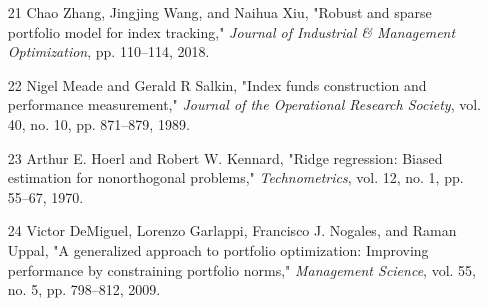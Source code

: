 \documentclass{article}
\begin{document}
\begin{itemize}
\item 
[21] Chao Zhang, Jingjing Wang, and Naihua Xiu, "Robust and sparse portfolio model for index tracking," \textit{Journal of Industrial \& Management Optimization}, pp. 110–114, 2018.

\item 
[22] Nigel Meade and Gerald R Salkin, "Index funds construction and performance measurement," \textit{Journal of the Operational Research Society}, vol. 40, no. 10, pp. 871–879, 1989.

\item 
[23] Arthur E. Hoerl and Robert W. Kennard, "Ridge regression: Biased estimation for nonorthogonal problems," \textit{Technometrics}, vol. 12, no. 1, pp. 55–67, 1970.

\item 
[24] Victor DeMiguel, Lorenzo Garlappi, Francisco J. Nogales, and Raman Uppal, "A generalized approach to portfolio optimization: Improving performance by constraining portfolio norms," \textit{Management Science}, vol. 55, no. 5, pp. 798–812, 2009.

\end{itemize}
\end{document}
